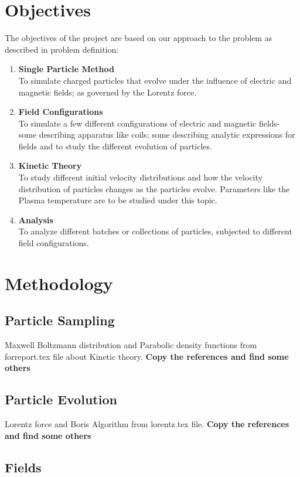 \documentclass[12pt]{article}
\begin{document}
	\section{Objectives}
	The objectives of the project are based on our approach to the problem as described in problem definition:
	\begin{enumerate}
		\item \textbf{Single Particle Method} \\ 
		To simulate charged particles that evolve under the influence of electric and magnetic fields; as governed by the Lorentz force.
		\item \textbf{Field Configurations} \\
		To simulate a few different configurations of electric and magnetic fields- some describing apparatus like coils; some describing analytic expressions for fields and to study the different evolution of particles.
		\item \textbf{Kinetic Theory} \\
		To study different initial velocity distributions and how the velocity distribution of particles changes as the particles evolve. Parameters like the Plasma temperature are to be studied under this topic.
		\item \textbf{Analysis} \\
		To analyze different batches or collections of particles, subjected to different field configurations.
		
	\end{enumerate}
	
	\section{Methodology}
	
	
	\subsection{Particle Sampling}
	Maxwell Boltzmann distribution and Parabolic density functions from forreport.tex file about Kinetic theory. \textbf{Copy the references and find some others}
	
	
	\subsection{Particle Evolution}
	Lorentz force and Boris Algorithm from lorentz.tex file. \textbf{Copy the references and find some others}
	
	\subsection{Fields}
	
\end{document}
